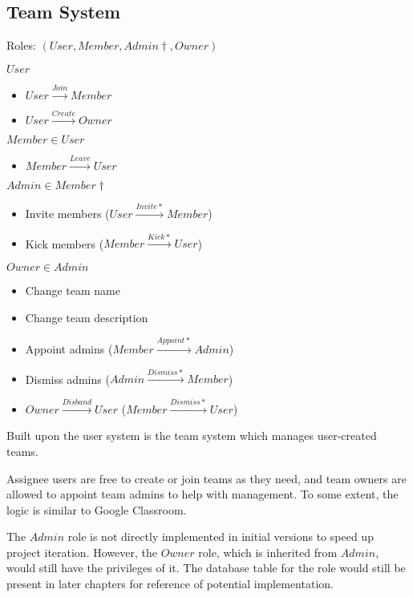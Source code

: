 \subsection{Team System}
\label{overview.capab.team}

Roles: $(User, Member, Admin\dagger{}, Owner)$

$User$
\begin{itemize}
	\item $User\xrightarrow{Join}Member$

	\item $User\xrightarrow{Create}Owner$
\end{itemize}

$Member\in{}User$
\begin{itemize}
	\item $Member\xrightarrow{Leave}User$
\end{itemize}

$Admin\in{}Member\dagger{}$
\begin{itemize}
	\item Invite members ($User\xrightarrow{Invite*}Member$)

	\item Kick members ($Member\xrightarrow{Kick*}User$)
\end{itemize}

$Owner\in{}Admin$
\begin{itemize}
	\item Change team name

	\item Change team description

	\item Appoint admins ($Member\xrightarrow{Appoint*}Admin$) \textdagger{}

	\item Dismiss admins ($Admin\xrightarrow{Dismiss*}Member$) \textdagger{}

	\item $Owner\xrightarrow{Disband}User$ ($Member\xrightarrow{Dismiss*}User$)
\end{itemize}

Built upon the user system is the team system which manages user-created teams.

Assignee users are free to create or join teams as they need, and team owners are
allowed to appoint team admins to help with management. To some extent, the logic
is similar to Google Classroom.

\textdagger{} The $Admin$ role is not directly implemented in initial versions
to speed up project iteration. However, the $Owner$ role, which is inherited from
$Admin$, would still have the privileges of it. The database table for the role would
still be present in later chapters for reference of potential implementation.

